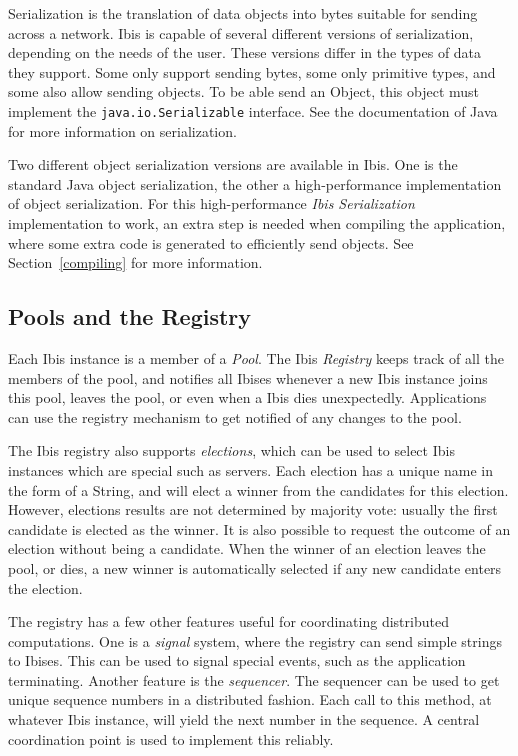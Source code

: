 \documentclass[10pt]{article}
\begin{document}
Serialization is the translation of data objects into bytes suitable for
sending across a network. Ibis is capable of several different versions
of serialization, depending on the needs of the user. These versions
differ in the types of data they support. Some only support sending
bytes, some only primitive types, and some also allow sending objects.
To be able send an Object, this object must implement the
\texttt{java.io.Serializable} interface. See the documentation of Java
for more information on serialization.

Two different object serialization versions are available in Ibis. One is
the standard Java object serialization, the other a high-performance
implementation of object serialization. For this high-performance
\emph{Ibis Serialization} implementation to work, an extra step is needed
when compiling the application, where some extra code is generated to
efficiently send objects. See Section~\ref{compiling} for
more information.

\subsection{Pools and the Registry}


Each Ibis instance is a member of a \emph{Pool}. The Ibis
\emph{Registry} keeps track of all the members of the pool, and notifies
all Ibises whenever a new Ibis instance joins this pool, leaves the
pool, or even when a Ibis dies unexpectedly. Applications can use the
registry mechanism to get notified of any changes to the pool.

The Ibis registry also supports \emph{elections}, which can be used to
select Ibis instances which are special such as servers.  Each election
has a unique name in the form of a String, and will elect a winner from
the candidates for this election. However, elections results are not determined 
by majority vote:
usually the first candidate is elected as the winner. It is also
possible to request the outcome of an election without being a
candidate. When the winner of an election leaves the pool, or dies, a
new winner is automatically selected if any new candidate enters the
election.

The registry has a few other features useful for coordinating
distributed computations. One is a \emph{signal} system, where the
registry can send simple strings to Ibises. This can be used to signal
special events, such as the application terminating. Another feature is
the \emph{sequencer}. The sequencer can be used to get unique sequence
numbers in a distributed fashion. Each call to this method, at
whatever Ibis instance, will yield the next number in the sequence. A
central coordination point is used to implement this reliably.
\end{document}
